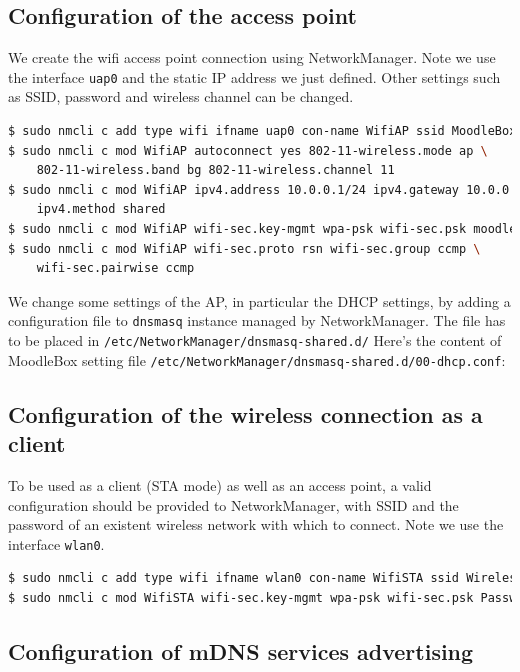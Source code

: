 \documentclass[12pt]{article}
\begin{document}
\subsection{Configuration of the access point}

We create the wifi access point connection using NetworkManager.
Note we use the interface \lstinline{uap0} and the static IP address we just defined.
Other settings such as SSID, password and wireless channel can be changed.
\begin{lstlisting}[language=bash]
$ sudo nmcli c add type wifi ifname uap0 con-name WifiAP ssid MoodleBox
$ sudo nmcli c mod WifiAP autoconnect yes 802-11-wireless.mode ap \
    802-11-wireless.band bg 802-11-wireless.channel 11
$ sudo nmcli c mod WifiAP ipv4.address 10.0.0.1/24 ipv4.gateway 10.0.0.1 \
    ipv4.method shared
$ sudo nmcli c mod WifiAP wifi-sec.key-mgmt wpa-psk wifi-sec.psk moodlebox
$ sudo nmcli c mod WifiAP wifi-sec.proto rsn wifi-sec.group ccmp \ 
    wifi-sec.pairwise ccmp
\end{lstlisting}

We change some settings of the AP, in particular the DHCP settings, by adding a configuration file to \lstinline{dnsmasq} instance managed by NetworkManager.
The file has to be placed in \lstinline{/etc/NetworkManager/dnsmasq-shared.d/}
Here's the content of MoodleBox setting file \lstinline{/etc/NetworkManager/dnsmasq-shared.d/00-dhcp.conf}:


\subsection{Configuration of the wireless connection as a client}

To be used as a client (STA mode) as well as an access point, a valid configuration should be provided to NetworkManager, with SSID and the password of an existent wireless network with which to connect.
Note we use the interface \lstinline{wlan0}.
\begin{lstlisting}[language=bash]
$ sudo nmcli c add type wifi ifname wlan0 con-name WifiSTA ssid WirelessLAN
$ sudo nmcli c mod WifiSTA wifi-sec.key-mgmt wpa-psk wifi-sec.psk Password
\end{lstlisting}

\subsection{Configuration of mDNS services advertising}
\end{document}
